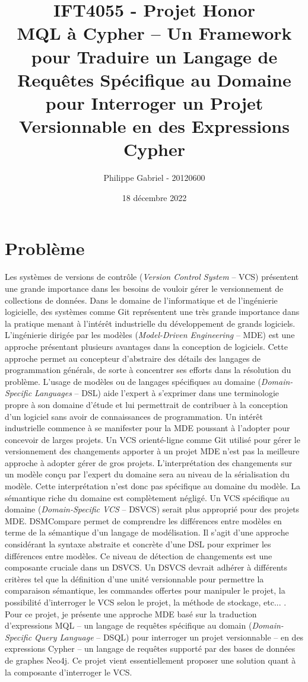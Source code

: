 \documentclass[12pt, titlepage]{article}
\title{\textbf{IFT4055 - Projet Honor} \\ MQL à Cypher -- Un Framework pour
  Traduire un Langage de Requêtes Spécifique au Domaine pour Interroger un
  Projet Versionnable en des Expressions Cypher}
\author{Philippe Gabriel - 20120600}
\date{18 décembre 2022}
\begin{document}
\maketitle
{}
\setcounter{page}{2}

\section*{Problème}

Les systèmes de versions de contrôle (\textit{Version Control System} -- VCS)
présentent une grande importance dans les besoins de vouloir gérer le
versionnement de collections de données. Dans le domaine de l'informatique et de
l'ingénierie logicielle, des systèmes comme Git représentent une très grande
importance dans la pratique menant à l'intérêt industrielle du développement de
grands logiciels. L'ingénierie dirigée par les modèles (\textit{Model-Driven
Engineering} -- MDE) est une approche présentant plusieurs avantages dans la
conception de logiciels. Cette approche permet au concepteur d'abstraire des
détails des langages de programmation générals, de sorte à concentrer ses
efforts dans la résolution du problème. L'usage de modèles ou de langages
spécifiques au domaine (\textit{Domain-Specific Languages} -- DSL) aide l'expert
à s'exprimer dans une terminologie propre à son domaine d'étude et lui
permettrait de contribuer à la conception d'un logiciel sans avoir de
connaissances de programmation. Un intérêt industrielle commence à se manifester
pour la MDE poussant à l'adopter pour concevoir de larges projets. Un VCS
orienté-ligne comme Git utilisé pour gérer le versionnement des changements
apporter à un projet MDE n'est pas la meilleure approche à adopter gérer de gros
projets. L'interprétation des changements sur un modèle conçu par l'expert du
domaine sera au niveau de la sérialisation du modèle. Cette interprétation n'est
donc pas spécifique au domaine du modèle. La sémantique riche du domaine est
complètement négligé. Un VCS spécifique au domaine (\textit{Domain-Specific VCS}
-- DSVCS) serait plus approprié pour des projets MDE. DSMCompare
\cite{dsmcompare} permet de comprendre les différences entre modèles en terme de
la sémantique d'un langage de modélisation. Il s'agit d'une approche considérant
la syntaxe abstraite et concrète d'une DSL pour exprimer les différences entre
modèles. Ce niveau de détection de changements est une composante cruciale dans
un DSVCS. Un DSVCS devrait adhérer à différents critères tel que la définition
d'une unité versionnable pour permettre la comparaison sémantique, les commandes
offertes pour manipuler le projet, la possibilité d'interroger le VCS selon le
projet, la méthode de stockage, etc... \cite{dsvcs}. Pour ce projet, je présente
une approche MDE basé sur la traduction d'expressions MQL -- un langage de
requêtes spécifique au domain (\textit{Domain-Specific Query Language} -- DSQL)
pour interroger un projet versionnable -- en des expressions Cypher -- un
langage de requêtes supporté par des bases de données de graphes Neo4j. Ce
projet vient essentiellement proposer une solution quant à la composante
d'interroger le VCS.
\end{document}
